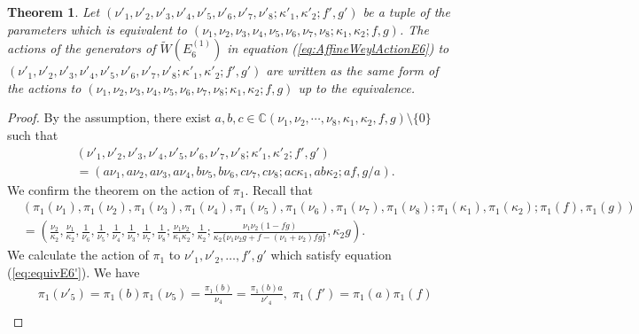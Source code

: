 \documentclass[10pt,a4paper]{amsart}
\newtheorem{thm}{Theorem}
\newcommand{\C}{\mathbb {C}}     %
\begin{document}
\begin{thm} \label{thm:E6compati}
Let $(\nu '_1 , \nu '_2 , \nu '_3 , \nu '_4 ,\nu '_5 ,\nu '_6 , \nu '_7 ,\nu '_8 ; \kappa '_1 ,\kappa '_2 ; f' ,g' ) $ be a tuple of the parameters which is equivalent to $ (\nu_1 , \nu_2 , \nu_3 , \nu_4 ,\nu_5 ,\nu_6 , \nu_7 ,\nu_8 ;\kappa_1 ,\kappa_2 ; f ,g )$.
The actions of the generators of  $\widetilde{W}(E^{(1)}_6)$ in equation (\ref{eq:AffineWeylActionE6}) to $(\nu '_1 , \nu '_2 , \nu '_3 , \nu '_4 ,\nu '_5 ,\nu '_6 , \nu '_7 ,\nu '_8 ; \kappa '_1 ,\kappa '_2 ; f' ,g' ) $ are written as the same form of the actions to $(\nu _1 , \nu _2 , \nu _3 , \nu _4 ,\nu _5 ,\nu _6 , \nu _7 ,\nu _8 ; \kappa _1 ,\kappa _2 ; f ,g ) $ up to the equivalence.
\end{thm}

\begin{proof}
By the assumption, there exist $ a, b, c \in \C (\nu_1 , \nu_2 , \cdots ,\nu_8 ,\kappa_1 ,\kappa_2 , f ,g ) \setminus \{ 0 \} $ such that 
\begin{align}
&  (\nu '_1 , \nu '_2 , \nu '_3 , \nu '_4 ,\nu '_5 ,\nu '_6 , \nu '_7 ,\nu '_8 ; \kappa '_1 ,\kappa '_2 ; f' ,g' )  \label{eq:equivE6'} \\
& = (a \nu_1 , a \nu_2 , a \nu_3 , a \nu_4 ,b \nu_5 , b \nu_6 , c \nu_7 , c \nu_8 ; ac \kappa_1 , ab \kappa_2 ; af ,g/a). \nonumber
\end{align}
We confirm the theorem on the action of $\pi _1$.
Recall that
\begin{align}
& (\pi _1 ( \nu _1) , \pi _1 (\nu _2) , \pi _1 ( \nu _3) , \pi _1 ( \nu _4) , \pi _1 (\nu _5) , \pi _1 (\nu _6) , \pi _1 ( \nu _7) , \pi _1 (\nu _8) ;  \pi _1 (\kappa _1) , \pi _1 (\kappa _2) ;  \pi _1 (f ) , \pi _1 (g) ) \\
& = ( \frac{\nu  _2 }{\kappa _2}  , \frac{\nu  _1 }{\kappa _2}   , \frac{1}{ \nu _6} , \frac{1}{\nu  _5}  , \frac{1}{\nu  _4}  ,  \frac{1}{\nu  _3}  ,  \frac{1}{\nu _7} , \frac{1}{\nu _8} ; \frac{\nu _1 \nu _2 }{ \kappa_1\kappa _2}  , \frac{1}{ \kappa _2} ; \frac{\nu _1 \nu_2 ( 1- fg )}{ \kappa_2 \{ \nu _1 \nu_2 g + f- (\nu _1 + \nu _2 ) fg \} } , \kappa_2 g  ). \nonumber 
\end{align}
We calculate the action of $\pi _1$ to $\nu '_1 , \nu '_2 , \dots  , f' ,g' $ which satisfy equation (\ref{eq:equivE6'}).
We have
\begin{align}
&  \pi _1 ( \nu '_5 ) = \pi _1 ( b ) \pi _1 (\nu _5 )  =  \frac{\pi _1 ( b ) }{\nu _4} = \frac{\pi _1 ( b ) a }{ \nu '_4 } , \; \pi _1 ( f ') =  \pi _1 ( a ) \pi _1 (f )  \\

\end{align}
\end{proof}
\end{document}
